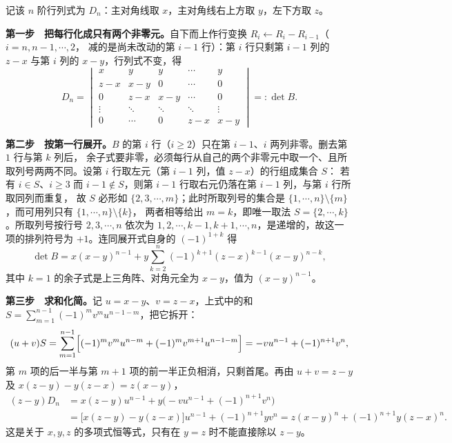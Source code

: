 
\begin{solution}
记该 $n$ 阶行列式为 $D_n$：主对角线取 $x$，主对角线右上方取 $y$，左下方取 $z$。

\textbf{第一步　把每行化成只有两个非零元。}自下而上作行变换 $R_i\leftarrow R_i-R_{i-1}$（$i=n,n-1,\cdots,2$，
减的是尚未改动的第 $i-1$ 行）：第 $i$ 行只剩第 $i-1$ 列的 $z-x$ 与第 $i$ 列的 $x-y$，行列式不变，得
\[
D_n=\begin{vmatrix}
x&y&y&\cdots&y\\
z-x&x-y&0&\cdots&0\\
0&z-x&x-y&\cdots&0\\
\vdots&\ddots&\ddots&\ddots&\vdots\\
0&\cdots&0&z-x&x-y
\end{vmatrix}=:\det B .
\]

\textbf{第二步　按第一行展开。}$B$ 的第 $i$ 行（$i\ge2$）只在第 $i-1$、$i$ 两列非零。删去第 $1$ 行与第 $k$ 列后，
余子式要非零，必须每行从自己的两个非零元中取一个、且所取列号两两不同。设第 $i$ 行取左元（第 $i-1$ 列，值 $z-x$）的行组成集合 $S$：
若有 $i\in S$、$i\ge3$ 而 $i-1\notin S$，则第 $i-1$ 行取右元仍落在第 $i-1$ 列，与第 $i$ 行所取同列而重复，
故 $S$ 必形如 $\{2,3,\cdots,m\}$；此时所取列号的集合是 $\{1,\cdots,n\}\setminus\{m\}$，而可用列只有 $\{1,\cdots,n\}\setminus\{k\}$，
两者相等给出 $m=k$，即唯一取法 $S=\{2,\cdots,k\}$。所取列号按行号 $2,3,\cdots,n$ 依次为
$1,2,\cdots,k-1,k+1,\cdots,n$，是递增的，故这一项的排列符号为 $+1$。连同展开式自身的 $(-1)^{1+k}$ 得
\[
\det B=x(x-y)^{n-1}+y\sum_{k=2}^{n}(-1)^{k+1}(z-x)^{k-1}(x-y)^{n-k},
\]
其中 $k=1$ 的余子式是上三角阵、对角元全为 $x-y$，值为 $(x-y)^{n-1}$。

\textbf{第三步　求和化简。}记 $u=x-y$、$v=z-x$，上式中的和 $S=\sum_{m=1}^{n-1}(-1)^{m}v^{m}u^{n-1-m}$，把它拆开：
\[
(u+v)S=\sum_{m=1}^{n-1}\Bigl[(-1)^{m}v^{m}u^{n-m}+(-1)^{m}v^{m+1}u^{n-1-m}\Bigr]=-vu^{n-1}+(-1)^{n+1}v^{n},
\]
第 $m$ 项的后一半与第 $m+1$ 项的前一半正负相消，只剩首尾。再由 $u+v=z-y$ 及 $x(z-y)-y(z-x)=z(x-y)$，
\begin{align*}
(z-y)D_n&=x(z-y)u^{n-1}+y\bigl(-vu^{n-1}+(-1)^{n+1}v^{n}\bigr)\\
&=\bigl[x(z-y)-y(z-x)\bigr]u^{n-1}+(-1)^{n+1}yv^{n}
=z(x-y)^{n}+(-1)^{n+1}y(z-x)^{n}.
\end{align*}
这是关于 $x,y,z$ 的多项式恒等式，只有在 $y=z$ 时不能直接除以 $z-y$。


\end{solution}
